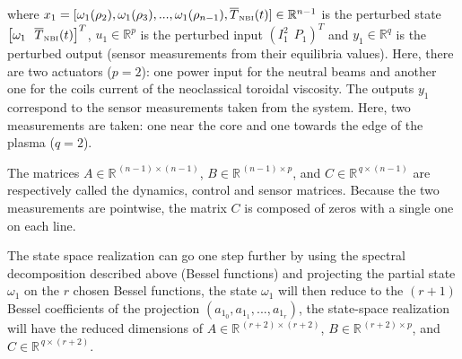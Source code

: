 \documentclass[12pt]{iopart}
\begin{document}
where $x_1 = [  \omega_1(\rho_2),  \omega_1(\rho_3), ...,   \omega_1(\rho_{n-1}), \overline{T}_\textrm{\tiny{NBI}}(t)     ] \in \mathbb{R}^{n-1}$ is the perturbed state $  \left[ \omega_1 \ \ \overline{T}_\textrm{\tiny{NBI}}(t)  \right]^T$, $u_1 \in \mathbb{R}^p$ is the perturbed input $\left( I^2_1 \ \  P_1 \right)^T$ and $y_1 \in \mathbb{R}^q$ is the perturbed output (sensor measurements from their equilibria values).
Here, there are two actuators ($p=2$): one power input for the neutral beams and another one for the coils current of the neoclassical toroidal viscosity.
The outputs $y_1$ correspond to the sensor measurements taken from the system. Here, two measurements are taken: one near the core and one towards the edge of the plasma ($q=2$).

The matrices $A \in \mathbb{R}^{\, (n-1) \times (n-1)}$, $B \in \mathbb{R}^{\,(n-1) \times p}$, and $C \in \mathbb{R}^{\, q \times (n-1)}$ are respectively called the dynamics, control and sensor matrices.
Because the two measurements are pointwise, the matrix $C$ is composed of zeros with a single one on each line.

The state space realization can go one step further by using the spectral decomposition described above (Bessel functions) and projecting the partial state $ \omega_1$ on the $r$ chosen Bessel functions, the state $ \omega_1$ will then reduce to the $(r+1)$ Bessel coefficients of the projection $(a_{1_0}, a_{1_1}, ..., a_{1_r})$, the state-space realization will have the reduced dimensions of $A \in \mathbb{R}^{\, (r+2) \times (r+2)}$, $B \in \mathbb{R}^{\,(r+2) \times p}$, and $C \in \mathbb{R}^{\, q \times (r+2)}$.
\end{document}
